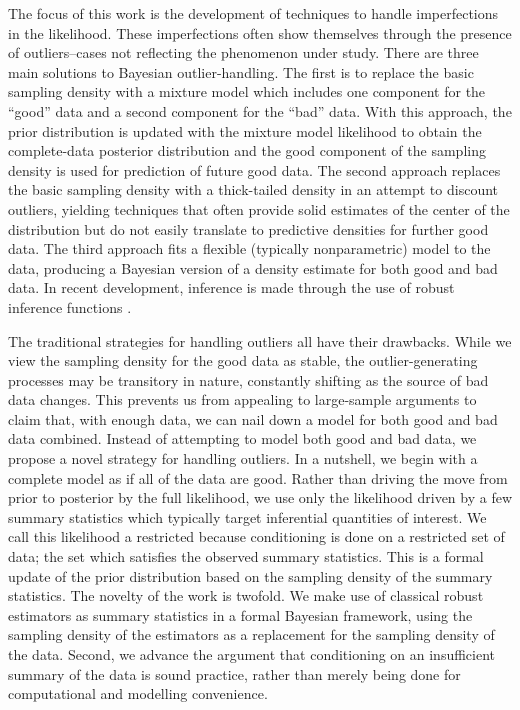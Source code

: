 \documentclass[ba]{imsart}
\begin{document}
The focus of this work is the development of techniques to handle imperfections in the likelihood.  These imperfections often show themselves through the presence of outliers--cases 
not reflecting the phenomenon under study. There are three main solutions to Bayesian outlier-handling.  The first is to replace the basic sampling
density with a mixture model which includes one component for the ``good'' data and a second 
component for the ``bad'' data.  With this approach, the prior distribution is updated with the  mixture model likelihood to obtain the complete-data posterior distribution and  the good component of the sampling density is used for prediction of future good data.  The second approach replaces the
basic sampling density with a thick-tailed density in an attempt to discount outliers, yielding techniques that 
often provide solid estimates of the center of the distribution but 
do not easily translate to predictive densities for further good data.  The third approach fits a flexible (typically nonparametric) model to  the data, producing a Bayesian version of a density estimate for both good and bad data.  In recent development, inference 
is made through the use of robust inference functions \citep{lee2014}.  

The traditional strategies for handling outliers all have their drawbacks.  While we view the sampling density for the good data as stable, the outlier-generating processes 
may be transitory in nature, constantly shifting as the source of bad data changes.  This prevents us from appealing to large-sample arguments to claim that, with enough data, we can nail down a model for both good and bad data combined.  Instead of attempting to model both good and bad data, we propose a novel strategy for handling outliers. In a nutshell, we begin with a complete model  as if all of the data are good. Rather than driving the move from prior to posterior  by the full likelihood, we use only the likelihood
driven by a few summary statistics which typically target inferential quantities
of interest.  We call this likelihood a restricted because conditioning is done on a restricted set of data; the set which satisfies the observed summary statistics. This is a formal update of the prior distribution based on the sampling density of the summary statistics. The novelty of the work is twofold.  We make use of classical robust estimators as  summary statistics in a formal
Bayesian framework, using the sampling density of the estimators as a replacement for the 
sampling density of the data.  Second, we advance the argument that conditioning on an insufficient summary of the data is sound practice, rather than merely being done for computational and modelling convenience.  
\end{document}
